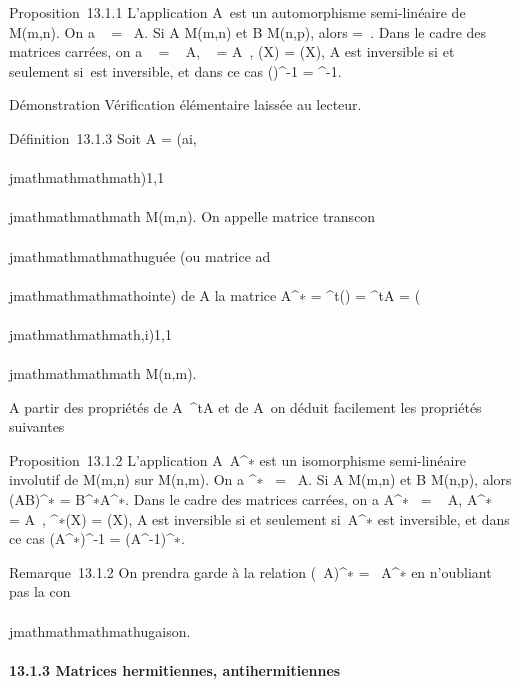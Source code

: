 Proposition~13.1.1 L'application
A\mapsto~\overlineA est un
automorphisme semi-linéaire de M(m,n). On a
\mathrmrg\overlineA~
= \mathrmrg~A. Si A \in
M(m,n) et B \in M(n,p), alors
\overlineAB =
\overlineA\,\overlineB.
Dans le cadre des matrices carrées, on a
~
\overlineA =
\overline{}~
A,
\overlineA~
=
\overline{}A~,
\chi\overlineA(X) =
\overline\chiA(X), A est inversible si et
seulement si~\overlineA est inversible, et dans ce
cas (\overlineA)^-1 =
\overlineA^-1.

Démonstration Vérification élémentaire laissée au lecteur.

Définition~13.1.3 Soit A = (ai,\\\\jmathmathmathmath)1\leqi\leqm,1\leq\\\\jmathmathmathmath\leqn \in
M(m,n). On appelle matrice transcon\\\\jmathmathmathmathuguée (ou matrice
ad\\\\jmathmathmathmathointe) de A la matrice A^∗ =
^t(\overlineA) =
\overline^tA =
(\overlinea\\\\jmathmathmathmath,i)1\leqi\leqm,1\leq\\\\jmathmathmathmath\leqn \in
M(n,m).

A partir des propriétés de A\mapsto~^tA
et de A\mapsto~\overlineA on
déduit facilement les propriétés suivantes

Proposition~13.1.2 L'application
A\mapsto~A^∗ est un isomorphisme
semi-linéaire involutif de M(m,n) sur M(n,m). On a
\mathrmrgA^∗~
= \mathrmrg~A. Si A \in
M(m,n) et B \in M(n,p), alors (AB)^∗ =
B^∗A^∗. Dans le cadre des matrices carrées, on a
 A^∗~ =
\overline{}~
A,
A^∗~ =
\overline{}A~,
\chiA^∗(X) =
\overline\chiA(X), A est inversible si et
seulement si~A^∗ est inversible, et dans ce cas
(A^∗)^-1 = (A^-1)^∗.

Remarque~13.1.2 On prendra garde à la relation (\lambda~A)^∗ =
\overline\lambda~A^∗ en n'oubliant pas la
con\\\\jmathmathmathmathugaison.

\paragraph{13.1.3 Matrices hermitiennes, antihermitiennes}

